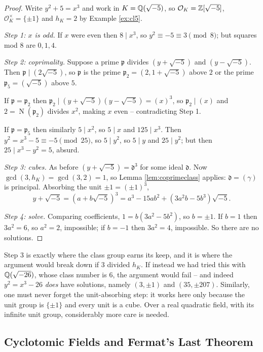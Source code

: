 \documentclass[a4paper]{scrartcl}
\renewcommand{\OO}{\mathcal{O}}
\newcommand{\Nm}{\operatorname{N}}
\newcommand{\fd}{\mathfrak{d}}
\newcommand{\fp}{\mathfrak{p}}
\begin{document}
\begin{proof}
	Write $y^2+5 = x^3$ and work in $K = \mathbb{Q}(\sqrt{-5})$, so $\OO_K = \Z[\sqrt{-5}]$, $\OO_K^\times = \{\pm1\}$ and $h_K = 2$ by Example \ref{ex:cl5}.

	\emph{Step 1: $x$ is odd.} If $x$ were even then $8 \mid x^3$, so $y^2 \equiv -5\equiv 3\pmod 8$; but squares mod $8$ are $0,1,4$.

	\emph{Step 2: coprimality.} Suppose a prime $\fp$ divides $(y+\sqrt{-5})$ and $(y-\sqrt{-5})$. Then $\fp \mid (2\sqrt{-5})$, so $\fp$ is the prime $\fp_2 = (2,1+\sqrt{-5})$ above $2$ or the prime $\fp_5 = (\sqrt{-5})$ above $5$.

	If $\fp = \fp_2$ then $\fp_2 \mid (y+\sqrt{-5})(y-\sqrt{-5}) = (x)^3$, so $\fp_2\mid(x)$ and $2 = \Nm(\fp_2)$ divides $x^2$, making $x$ even -- contradicting Step 1.

	If $\fp = \fp_5$ then similarly $5 \mid x^2$, so $5\mid x$ and $125 \mid x^3$. Then $y^2 = x^3-5 \equiv -5 \pmod{25}$, so $5 \mid y^2$, so $5\mid y$ and $25 \mid y^2$; but then $25 \mid x^3-y^2 = 5$, absurd.

	\emph{Step 3: cubes.} As before $(y+\sqrt{-5}) = \fd^3$ for some ideal $\fd$. Now $\gcd(3, h_K) = \gcd(3,2) = 1$, so Lemma \ref{lem:coprimeclass} applies: $\fd = (\gamma)$ is principal. Absorbing the unit $\pm1 = (\pm1)^3$,
	$$y+\sqrt{-5} = \left(a+b\sqrt{-5}\right)^3 = a^3-15ab^2 + \left(3a^2b-5b^3\right)\sqrt{-5}.$$

	\emph{Step 4: solve.} Comparing coefficients, $1 = b(3a^2-5b^2)$, so $b = \pm1$. If $b = 1$ then $3a^2 = 6$, so $a^2 = 2$, impossible; if $b=-1$ then $3a^2 = 4$, impossible. So there are no solutions.
\end{proof}

\begin{remark}
	Step 3 is exactly where the class group earns its keep, and it is where the argument would break down if $3$ divided $h_K$. If instead we had tried this with $\mathbb{Q}(\sqrt{-26})$, whose class number is $6$, the argument would fail -- and indeed $y^2 = x^3-26$ \emph{does} have solutions, namely $(3,\pm1)$ and $(35,\pm207)$. Similarly, one must never forget the unit-absorbing step: it works here only because the unit group is $\{\pm1\}$ and every unit is a cube. Over a real quadratic field, with its infinite unit group, considerably more care is needed.
\end{remark}

\subsection{Cyclotomic Fields and Fermat's Last Theorem}
\end{document}
